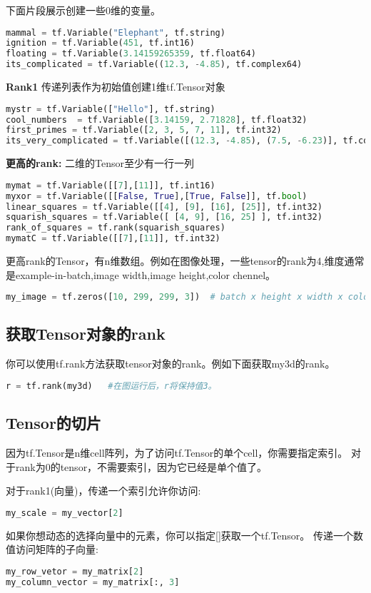 下面片段展示创建一些0维的变量。
\begin{lstlisting}[language=Python]
mammal = tf.Variable("Elephant", tf.string)
ignition = tf.Variable(451, tf.int16)
floating = tf.Variable(3.14159265359, tf.float64)
its_complicated = tf.Variable((12.3, -4.85), tf.complex64)
\end{lstlisting}
\textbf{Rank1}
传递列表作为初始值创建1维tf.Tensor对象
\begin{lstlisting}[language=Python]
mystr = tf.Variable(["Hello"], tf.string)
cool_numbers  = tf.Variable([3.14159, 2.71828], tf.float32)
first_primes = tf.Variable([2, 3, 5, 7, 11], tf.int32)
its_very_complicated = tf.Variable([(12.3, -4.85), (7.5, -6.23)], tf.complex64)
\end{lstlisting}
\textbf{更高的rank:}
二维的Tensor至少有一行一列
\begin{lstlisting}[language=Python]
mymat = tf.Variable([[7],[11]], tf.int16)
myxor = tf.Variable([[False, True],[True, False]], tf.bool)
linear_squares = tf.Variable([[4], [9], [16], [25]], tf.int32)
squarish_squares = tf.Variable([ [4, 9], [16, 25] ], tf.int32)
rank_of_squares = tf.rank(squarish_squares)
mymatC = tf.Variable([[7],[11]], tf.int32)
\end{lstlisting}
更高rank的Tensor，有n维数组。例如在图像处理，一些tensor的rank为4,维度通常是example-in-batch,image width,image height,color chennel。
\begin{lstlisting}[language=Python]
my_image = tf.zeros([10, 299, 299, 3])  # batch x height x width x color
\end{lstlisting}
\subsection{获取Tensor对象的rank}
你可以使用tf.rank方法获取tensor对象的rank。例如下面获取my3d的rank。
\begin{lstlisting}[language=Python]
r = tf.rank(my3d)	#在图运行后，r将保持值3。
\end{lstlisting}
\subsection{Tensor的切片}
因为tf.Tensor是n维cell阵列，为了访问tf.Tensor的单个cell，你需要指定索引。
对于rank为0的tensor，不需要索引，因为它已经是单个值了。\par
对于rank1(向量)，传递一个索引允许你访问:
\begin{lstlisting}[language=Python]
my_scale = my_vector[2]
\end{lstlisting}
如果你想动态的选择向量中的元素，你可以指定[]获取一个tf.Tensor。
传递一个数值访问矩阵的子向量:
\begin{lstlisting}[language=Python]
my_row_vetor = my_matrix[2]
my_column_vector = my_matrix[:, 3]
\end{lstlisting}
